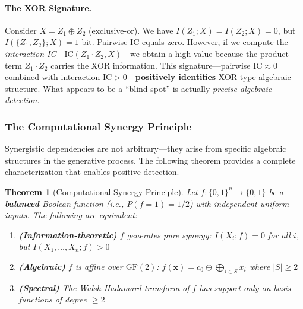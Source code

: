 \documentclass[10pt]{article} %
\theoremstyle{plain}
\newtheorem{theorem}{Theorem}[section]
\theoremstyle{definition}
\newcommand{\IC}{\mathrm{IC}}  %
\begin{document}
\paragraph{The XOR Signature.} Consider $X = Z_1 \oplus Z_2$ (exclusive-or). We have $I(Z_1; X) = I(Z_2; X) = 0$, but $I(\{Z_1, Z_2\}; X) = 1$ bit. Pairwise IC equals zero. However, if we compute the \emph{interaction IC}---$\IC(Z_1 \cdot Z_2, X)$---we obtain a high value because the product term $Z_1 \cdot Z_2$ carries the XOR information. This signature---pairwise $\IC \approx 0$ combined with interaction $\IC > 0$---\textbf{positively identifies} XOR-type algebraic structure. What appears to be a ``blind spot'' is actually \emph{precise algebraic detection}.

\subsubsection{The Computational Synergy Principle}

Synergistic dependencies are not arbitrary---they arise from specific algebraic structures in the generative process. The following theorem provides a complete characterization that enables positive detection.

\begin{theorem}[Computational Synergy Principle]
\label{thm:synergy}
Let $f : \{0, 1\}^n \to \{0, 1\}$ be a \textbf{balanced} Boolean function (i.e., $P(f=1) = 1/2$) with independent uniform inputs. The following are equivalent:
\begin{enumerate}
    \item \textbf{(Information-theoretic)} $f$ generates pure synergy: $I(X_i; f) = 0$ for all $i$, but $I(X_1, \ldots, X_n; f) > 0$
    \item \textbf{(Algebraic)} $f$ is affine over $\text{GF}(2)$: $f(\mathbf{x}) = c_0 \oplus \bigoplus_{i \in S} x_i$ where $|S| \geq 2$
    \item \textbf{(Spectral)} The Walsh-Hadamard transform of $f$ has support only on basis functions of degree $\geq 2$
\end{enumerate}
\end{theorem}
\end{document}
